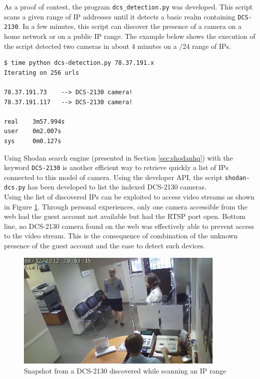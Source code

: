 As a proof of contest, the program \texttt{dcs\_detection.py} was developed.
This script scans a given range of IP addresses until it detects a basic realm containing \texttt{DCS-2130}.
In a few minutes, this script can discover the presence of a camera on a home network or on a public IP range.
The example below shows the execution of the script detected two cameras in about 4 minutes on a /24 range of IPs.\\

{\scriptsize
\begin{verbatim}
$ time python dcs-detection.py 78.37.191.x
Iterating on 256 urls

78.37.191.73    --> DCS-2130 camera!
78.37.191.117   --> DCS-2130 camera!

real    3m57.994s
user    0m2.007s
sys     0m0.127s
\end{verbatim}
}

Using Shodan search engine (presented in Section \ref{sec:shodanhq}) with the keyword \texttt{DCS-2130} is another efficient way to retrieve quickly a list of IPs connected to this model of camera.
Using the developer API, the script \texttt{shodan-dcs.py} has been developed to list the indexed DCS-2130 cameras.\\

Using the list of discovered IPs can be exploited to access video streams as shown in Figure \ref{fig:cam-snapshot}.
Through personal experiences, only one camera accessible from the web had the guest account not available but had the RTSP port open.
Bottom line, no DCS-2130 camera found on the web was effectively able to prevent access to the video stream.
This is the consequence of combination of the unknown presence of the guest account and the ease to detect such devices.

\begin{figure}[h]
  \centering
  \includegraphics[width=10cm]{images/dms2.jpg}
  \caption{Snapshot from a DCS-2130 discovered while scanning an IP range}
  \label{fig:cam-snapshot}
\end{figure}

